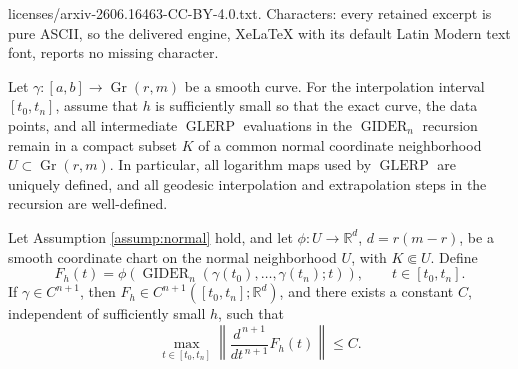 \documentclass[10pt,a4paper]{amsart}
\DeclareMathOperator{\Gr}{Gr}
\newcommand{\GIDER}{\operatorname{GIDER}}
\newcommand{\GLERP}{\operatorname{GLERP}}
\newcommand{\bR}{\mathbb{R}}
\begin{document}
licenses/arxiv-2606.16463-CC-BY-4.0.txt. Characters: every retained excerpt is pure ASCII, so the delivered engine, XeLaTeX with its default Latin Modern text font, reports no missing character.
\begin{assump}\label{assump:normal}
Let \(\gamma:[a,b]\to\Gr(r,m)\) be a smooth curve.  For the interpolation interval \([t_0,t_n]\), assume that \(h\) is sufficiently small so that the exact curve, the data points, and all intermediate \(\GLERP\) evaluations in the \(\GIDER_n\) recursion remain in a compact subset \(K\) of a common normal coordinate neighborhood \(U\subset\Gr(r,m)\).  In particular, all logarithm maps used by \(\GLERP\) are uniquely defined, and all geodesic interpolation and extrapolation steps in the recursion are well-defined.
\end{assump}

\begin{lemma}\label{lemma:local_stability}
Let Assumption \ref{assump:normal} hold, and let \(\phi:U\to\bR^d\), \(d=r(m-r)\), be a smooth coordinate chart on the normal neighborhood \(U\), with \(K\Subset U\).  Define
\[
    F_h(t)
    =
    \phi\left(\GIDER_n(\gamma(t_0),\ldots,\gamma(t_n);t)\right),
    \qquad t\in[t_0,t_n].
\]
If \(\gamma\in C^{n+1}\), then \(F_h\in C^{n+1}([t_0,t_n];\bR^d)\), and there exists a constant \(C\), independent of sufficiently small \(h\), such that
\[
    \max_{t\in[t_0,t_n]}
    \left\|
        \frac{d^{\,n+1}}{dt^{\,n+1}}F_h(t)
    \right\|
    \le C.
\]
\end{lemma}
\end{document}

